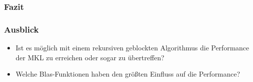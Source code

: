 \begin{frame}
\frametitle{Fazit}
\end{frame}

\begin{frame}
\frametitle{Ausblick}
\begin{itemize}
	\item Ist es möglich mit einem rekursiven geblockten Algorithmus die Performance der MKL zu erreichen oder sogar zu übertreffen?
	\item Welche Blas-Funktionen haben den größten Einfluss auf die Performance? 
\end{itemize}
\end{frame}




